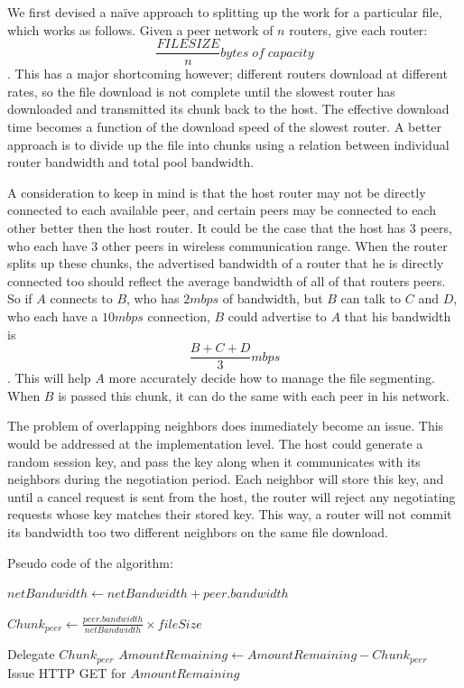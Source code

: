 \documentclass[12pt]{article}
\begin{document}
			We first devised a na\"{i}ve approach to splitting up the work for a particular file, which works as follows. Given a peer network of $n$ routers, give each router: $$\frac{FILESIZE}{n} bytes\; of\; capacity$$. This has a major shortcoming however; different routers download at different rates, so the file download is not complete until the slowest router has downloaded and transmitted its chunk back to the host. The effective download time becomes a function of the download speed of the slowest router. A better approach is to divide up the file into chunks using a relation between individual router bandwidth and total pool bandwidth.

			A consideration to keep in mind is that the host router may not be directly connected to each available peer, and certain peers may be connected to each other better then the host router. It could be the case that the host has 3 peers, who each have 3 other peers in wireless communication range. When the router splits up these chunks, the advertised bandwidth of a router that he is directly connected too should reflect the average bandwidth of all of that routers peers. So if $A$ connects to $B$, who has $2 mbps$ of bandwidth, but $B$ can talk to $C$ and $D$, who each have a $10 mbps$ connection, $B$ could advertise to $A$ that his bandwidth is $$\frac{B + C + D}{3} mbps$$. This will help $A$ more accurately decide how to manage the file segmenting. When $B$ is passed this chunk, it can do the same with each peer in his network.

			The problem of overlapping neighbors does immediately become an issue. This would be addressed at the implementation level. The host could generate a random session key, and pass the key along when it communicates with its neighbors during the negotiation period. Each neighbor will store this key, and until a cancel request is sent from the host, the router will reject any negotiating requests whose key matches their stored key. This way, a router will not commit its bandwidth too two different neighbors on the same file download.

			Pseudo code of the algorithm:

			\begin{algorithmic}
					\State $netBandwidth\gets netBandwidth + peer.bandwidth$
				\EndFor

					\State $Chunk_{peer} \gets \frac{peer.bandwidth}{netBandwidth} \times{fileSize}$
				\EndFor

					Delegate $Chunk_{peer}$
					\State $AmountRemaining \gets AmountRemaining - Chunk_{peer}$
				\EndFor\\
				Issue HTTP GET for $AmountRemaining$
			\end{algorithmic}
\end{document}
